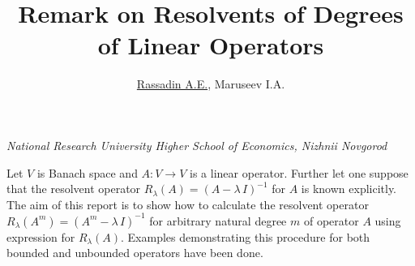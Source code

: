 \documentclass[12pt]{article}
\title{\bf\Large Remark on Resolvents of Degrees of Linear Operators}
\author{\underline{Rassadin A.E.}, Maruseev I.A.}
\date{}
\begin{document}
\begin{center}
	\maketitle
	{\large\textit{National Research University Higher School of Economics, Nizhnii Novgorod}}
\end{center}

Let $V$ is Banach space and $A:V\rightarrow V$ is a linear operator. Further let one suppose that the resolvent operator 
$R_\lambda(A)=(A-\lambda\, I)^{-1}$ for $A$ is known explicitly. The aim of this report is to show how to calculate the resolvent operator
$R_\lambda(A^m)=(A^m-\lambda\, I)^{-1}$ for arbitrary natural degree $m$ of operator $A$ using expression for $R_\lambda(A)$. Examples demonstrating this procedure for both bounded and unbounded operators have been done.
\end{document}
